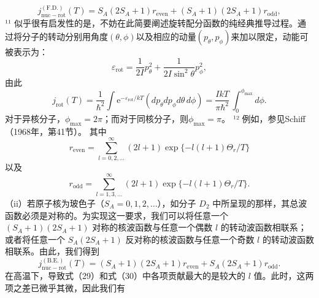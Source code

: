 \begin{equation}\tag{6.5.31}\label{eq:6.5.31}
j _ { \mathrm { n u c - r o t } } ^{\mathrm { ( F . D . )} } ( T ) = S _ { A } ( 2 S _ { A } + 1 ) r _ { \mathrm { e v e n } } + ( S _ { A } + 1 ) ( 2 S _ { A } + 1 ) r _ { \mathrm { o d d } } ,
\end{equation}
¹¹ 似乎很有启发性的是，不妨在此简要阐述旋转配分函数的纯经典推导过程。通过将分子的转动分别用角度\((\theta,\phi)\)以及相应的动量\((p_{\theta},p_{\phi})\)来加以限定，动能可被表示为：
\begin{equation}\tag{6.5.32}\label{eq:6.5.32}
\varepsilon _ { \mathrm { r o t } } = \frac { 1 } { 2 I } p _ { \theta } ^{2} + \frac { 1 } { 2 I \sin ^{2} \theta } p _ { \phi } ^{2} ,
\end{equation}
由此
\begin{equation}\tag{6.5.33}\label{eq:6.5.33}
j _ { \mathrm { r o t } } ( T ) = \frac { 1 } { \hbar ^{2} } \int \mathrm { e } ^{- \varepsilon _ { \mathrm { r o t} } / k T } ( d p _ { \theta } d p _ { \phi } d \theta \, d \phi ) = \frac { I k T } { \pi \hbar ^{2} } \, \int _ { 0 } ^{\phi _ { \mathrm { m a x} } } d \phi .
\end{equation}
对于异核分子，\(\phi_{\mathrm{max}}=2\pi\)；而对于同核分子，则\(\phi_{\mathrm{max}}=\pi\)。
¹² 例如，参见Schiff（1968年，第41节）。
其中
\begin{equation}\tag{6.5.34}\label{eq:6.5.34}
r _ { \mathrm { e v e n } } = \sum _ { l = 0 , 2 , \ldots } ^{\infty} ( 2 l + 1 ) \exp \{ - l ( l + 1 ) \Theta _ { r } / T \}
\end{equation}
以及
\begin{equation}\tag{6.5.35}\label{eq:6.5.35}
r _ { \mathrm { o d d } } = \sum _ { l = 1 , 3 , \ldots } ^{\infty} ( 2 l + 1 ) \exp \{ - l ( l + 1 ) \Theta _ { r } / T \} .
\end{equation}
（ii）若原子核为玻色子（\(S_{A}=0,1,2,\ldots\)），如分子 \(D_{2}\) 中所呈现的那样，其总波函数必须是对称的。为实现这一要求，我们可以将任意一个 \((S_{A}+1)(2S_{A}+1)\) 对称的核波函数与任意一个偶数 \(l\) 的转动波函数相联系；或者将任意一个 \(S_{A}(2S_{A}+1)\) 反对称的核波函数与任意一个奇数 \(l\) 的转动波函数相联系。由此，我们得到
\begin{equation}\tag{6.5.36}\label{eq:6.5.36}
j _ { \mathrm { n u c - r o t } } ^{\mathrm { ( B . E . )} } ( T ) = ( S _ { A } + 1 ) ( 2 S _ { A } + 1 ) r _ { \mathrm { e v e n } } + S _ { A } ( 2 S _ { A } + 1 ) r _ { \mathrm { o d d } } .
\end{equation}
在高温下，导致式（29）和式（30）中各项贡献最大的是较大的 \(l\) 值。此时，这两项之差已微乎其微，因此我们有
